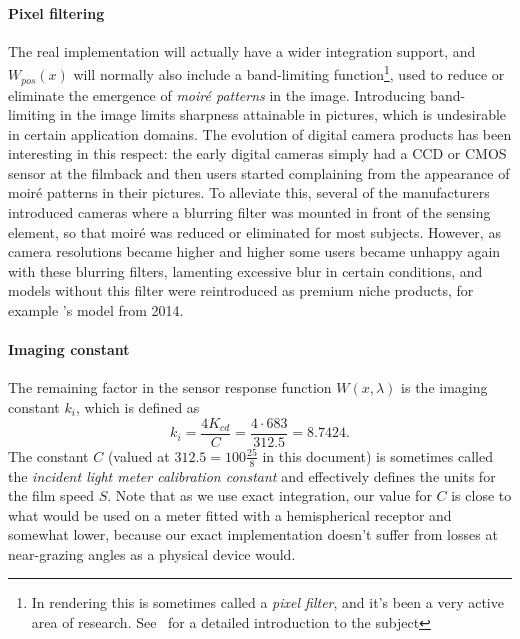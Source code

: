 \paragraph{Pixel filtering}
The real implementation will actually have a wider integration support,
and $W_{pos}(x)$ will normally also include a band-limiting function\footnote{
	In rendering this is sometimes called a \textsl{\gls{pixel filter}}, and it's 
	been a very active area of research. See~\cite{pharr2023} for a detailed
	introduction to the subject}, 
used to reduce or eliminate the emergence of \emph{moir\'e patterns} in the image. 
Introducing band-limiting in the image limits sharpness attainable in pictures,
which is undesirable in certain application domains. 
The evolution of digital camera products has been interesting in this respect:
the early digital cameras simply had a \gls{CCD} or \gls{CMOS} sensor at the 
filmback and then users started complaining from the appearance of moir\'e 
patterns in their pictures. 
To alleviate this, several of the manufacturers introduced cameras where a 
blurring filter was mounted in front of the sensing element, 
so that moir\'e was reduced or eliminated for most subjects. 
However, as camera resolutions became higher and higher some users became unhappy again
with these blurring filters, lamenting excessive blur in certain conditions, 
and models without this filter were reintroduced as premium niche products, 
for example 's  model from 2014.


\paragraph{Imaging constant}

The remaining factor in the sensor response function $W(x,\lambda)$ is the
imaging constant $k_i$, which is defined as
\begin{equation}\label{eqn:imaging_ki}
	k_i = \frac{4K_{cd}}{C} = \frac{4\cdot683}{312.5} = 8.7424.
\end{equation}
The constant $C$ (valued at $312.5 = 100 \frac{25}8$ in this document) is sometimes called the \textsl{incident light meter
calibration constant} and effectively defines the units for the \gls{film speed} $S$.
Note that as we use exact integration, our value for $C$ is close to what would be used on a meter fitted with a hemispherical receptor and somewhat lower, because our exact implementation doesn't suffer from losses at near-grazing angles as a physical device would.

